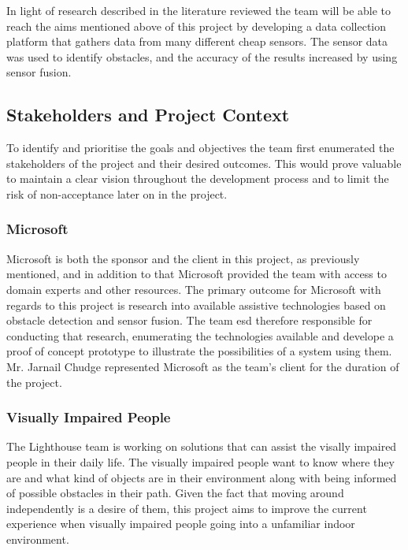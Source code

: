 \documentclass[prodmode,acmtosem]{acmsmall} %
\begin{document}
In light of research described in the literature reviewed the team will be able to reach the aims mentioned above of this project by developing a data collection platform that gathers data from many different cheap sensors. The sensor data was used to identify obstacles, and the accuracy of the results increased by using sensor fusion.





\subsection{Stakeholders and Project Context}
To identify and prioritise the goals and objectives the team first enumerated the stakeholders of the project and their desired outcomes. This would prove valuable to maintain a clear vision throughout the development process and to limit the risk of non-acceptance later on in the project.

\subsubsection{Microsoft}
Microsoft is both the sponsor and the client in this project, as previously mentioned, and in addition to that Microsoft provided the team with access to domain experts and other resources. The primary outcome for Microsoft with regards to this project is research into available assistive technologies based on obstacle detection and sensor fusion. The team esd therefore responsible for conducting that research, enumerating the technologies available and develope a proof of concept prototype to illustrate the possibilities of a system using them.
Mr. Jarnail Chudge represented Microsoft as the team's client for the duration of the project.

\subsubsection{Visually Impaired People}
The Lighthouse team is working on solutions that can assist the visally impaired people in their daily life. The visually impaired people want to know where they are and what kind of objects are in their environment along with being informed of possible obstacles in their path. Given the fact that moving around independently is a desire of them, this project aims to improve the current experience when visually impaired people going into a unfamiliar indoor environment.
\end{document}
